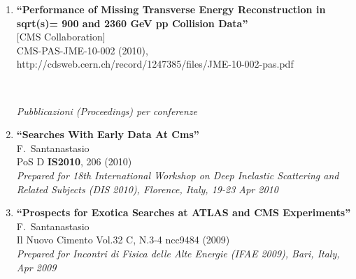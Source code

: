 \documentclass[10pt]{letter}
\begin{document}
\begin{enumerate}
\item
{\bf ``Performance of Missing Transverse Energy Reconstruction in sqrt(s)= 900 and 2360 GeV pp Collision Data''}
\\{}[CMS Collaboration]
\\{}CMS-PAS-JME-10-002 (2010), http://cdsweb.cern.ch/record/1247385/files/JME-10-002-pas.pdf


~\\
\begin{center} \textit{Pubblicazioni (Proceedings) per conferenze} \\ 
\end{center}

\item%
{\bf ``Searches With Early Data At Cms''}
  \\{}F.~Santanastasio
  \\{}PoS D {\bf IS2010}, 206 (2010)
\\{}{\it Prepared for 18th International Workshop on Deep Inelastic Scattering and Related Subjects (DIS 2010), Florence, Italy, 19-23 Apr 2010}

\item%
{\bf ``Prospects for Exotica Searches at ATLAS and CMS Experiments''}
  \\{}F.~Santanastasio
  \\{}Il Nuovo Cimento Vol.32 C, N.3-4 ncc9484 (2009)
\\{}{\it Prepared for Incontri di Fisica delle Alte Energie (IFAE 2009), Bari, Italy, Apr 2009}



\end{enumerate}
\end{document}
